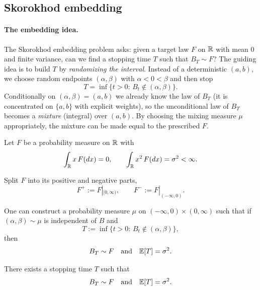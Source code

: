 \subsection{Skorokhod embedding}

\paragraph{The embedding idea.}
The Skorokhod embedding problem asks:
given a target law $F$ on $\mathbb{R}$ with mean $0$ and finite variance, can we find a stopping time $T$ such that
$B_T\sim F$?
The guiding idea is to build $T$ by \emph{randomizing the interval}.
Instead of a deterministic $(a,b)$, we choose random endpoints $(\alpha,\beta)$ with $\alpha<0<\beta$ and then stop
\[
T=\inf\{t>0:\,B_t\notin(\alpha,\beta)\}.
\]
Conditionally on $(\alpha,\beta)=(a,b)$ we already know the law of $B_T$ (it is concentrated on $\{a,b\}$ with explicit weights),
so the unconditional law of $B_T$ becomes a \emph{mixture} (integral) over $(a,b)$.
By choosing the mixing measure $\mu$ appropriately, the mixture can be made equal to the prescribed $F$.

\medskip

Let $F$ be a probability measure on $\mathbb{R}$ with
\[
\int_{\mathbb{R}} x\,F(dx)=0,
\qquad
\int_{\mathbb{R}} x^2\,F(dx)=\sigma^2<\infty.
\]

Split $F$ into its positive and negative parts,
\[
F^+ := F|_{[0,\infty)},\qquad F^- := F|_{(-\infty,0)}.
\]

One can construct a probability measure $\mu$ on
$(-\infty,0)\times(0,\infty)$ such that if
$(\alpha,\beta)\sim\mu$ is independent of $B$ and
\[
T:=\inf\{t>0:\, B_t\notin(\alpha,\beta)\},
\]
then
\[
B_T\sim F
\quad\text{and}\quad
\mathbb{E}[T]=\sigma^2.
\]

\begin{theorem}
There exists a stopping time $T$ such that
\[
B_T\sim F
\quad\text{and}\quad
\mathbb{E}[T]=\sigma^2.
\]
\end{theorem}

